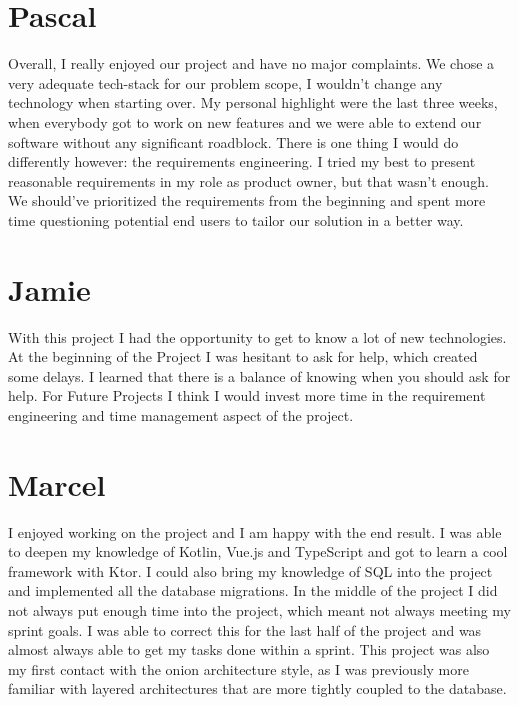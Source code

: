 \section{Pascal}
Overall, I really enjoyed our project and have no major complaints.
We chose a very adequate tech-stack for our problem scope, I wouldn't change any technology when starting over.
My personal highlight were the last three weeks, when everybody got to work on new features and we were able to extend our software without any significant roadblock.
There is one thing I would do differently however: the requirements engineering.
I tried my best to present reasonable requirements in my role as product owner, but that wasn't enough.
We should've prioritized the requirements from the beginning and spent more time questioning potential end users to tailor our solution in a better way.

\section{Jamie}
With this project I had the opportunity to get to know a lot of new technologies. At the beginning of the Project I was hesitant to ask for help, which created some delays.
I learned that there is a balance of knowing when you should ask for help. For Future Projects I think I would invest more time in the requirement engineering and time management
aspect of the project.

\section{Marcel}
I enjoyed working on the project and I am happy with the end result. I was able to deepen my knowledge of Kotlin, Vue.js and TypeScript and got to learn a cool framework with Ktor. I could also bring my knowledge of SQL into the project and implemented all the database migrations. In the middle of the project I did not always put enough time into the project, which meant not always meeting my sprint goals. I was able to correct this for the last half of the project and was almost always able to get my tasks done within a sprint. This project was also my first contact with the onion architecture style, as I was previously more familiar with layered architectures that are more tightly coupled to the database.
